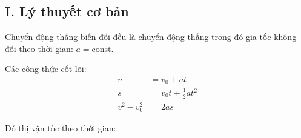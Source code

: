 \subsection{I. Lý thuyết cơ bản}
Chuyển động thẳng biến đổi đều là chuyển động thẳng trong đó gia tốc không đổi theo thời gian: $a = \text{const}$.

Các công thức cốt lõi:
\begin{align*}
v &= v_0 + at \\
s &= v_0 t + \frac{1}{2}at^2 \\
v^2 - v_0^2 &= 2as
\end{align*}

Đồ thị vận tốc theo thời gian:
\begin{center}
\end{center}
